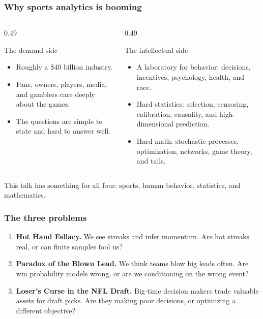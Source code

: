 \documentclass[aspectratio=169,professionalfonts]{beamer}
\begin{document}
\begin{frame}
\frametitle{Why sports analytics is booming}
\begin{columns}[T,totalwidth=\textwidth]
\begin{column}{0.49\textwidth}
\begin{block}{The demand side}
\begin{itemize}
  \item Roughly a \$40 billion industry.
  \item Fans, owners, players, media, and gamblers care deeply about the games.
  \item The questions are simple to state and hard to answer well.
\end{itemize}
\end{block}
\end{column}
\begin{column}{0.49\textwidth}
\begin{block}{The intellectual side}
\begin{itemize}
  \item A laboratory for behavior: decisions, incentives, psychology, health, and race.
  \item Hard statistics: selection, censoring, calibration, causality, and high-dimensional prediction.
  \item Hard math: stochastic processes, optimization, networks, game theory, and tails.
\end{itemize}
\end{block}
\end{column}
\end{columns}

\vspace{2mm}
\centering

\alert{This talk has something for all four: sports, human behavior, statistics, and mathematics.}
\end{frame}

\begin{frame}
\frametitle{The three problems}
\begin{enumerate}
  \item \textbf{Hot Hand Fallacy.} We see streaks and infer momentum. Are hot streaks real, or can finite samples fool us?
  \item \textbf{Paradox of the Blown Lead.} We think teams blow big leads often. Are win probability models wrong, or are we conditioning on the wrong event?
  \item \textbf{Loser's Curse in the NFL Draft.} Big-time decision makers trade valuable assets for draft picks. Are they making poor decisions, or optimizing a different objective?
\end{enumerate}

\end{frame}
\end{document}
